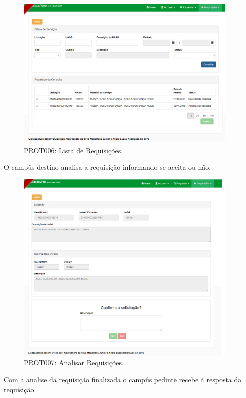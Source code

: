 \begin{figure}[H]
	\centering
	\includegraphics[width=0.95\textwidth]{figuras/prototipo006.png}
	\caption[PROT006: Lista de Requisições]{PROT006: Lista de Requisições.}
\end{figure}

O campûs destino analisa a requisição informando se aceita ou não.

\begin{figure}[H]
	\centering
	\includegraphics[width=0.95\textwidth]{figuras/prototipo007.png}
	\caption[PROT007: Analisar Requisições]{PROT007: Analisar Requisições.}
\end{figure}

Com a analise da requisição finalizada o campûs pedinte recebe á resposta da requisição.


